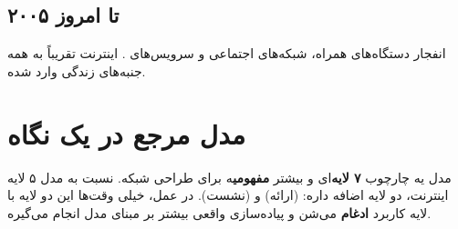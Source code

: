 \subsection{۲۰۰۵ تا امروز}
انفجار دستگاه‌های همراه، شبکه‌های اجتماعی و سرویس‌های . اینترنت تقریباً به همه جنبه‌های زندگی وارد شده.

\section{مدل مرجع  در یک نگاه}
مدل  یه چارچوب \textbf{۷ لایه}‌ای و بیشتر \textbf{مفهومی}ه برای طراحی شبکه. نسبت به مدل ۵ لایه اینترنت، دو لایه اضافه داره:  (ارائه) و  (نشست). در عمل، خیلی وقت‌ها این دو لایه با لایه کاربرد  \textbf{ادغام} می‌شن و پیاده‌سازی واقعی بیشتر بر مبنای مدل  انجام می‌گیره.
